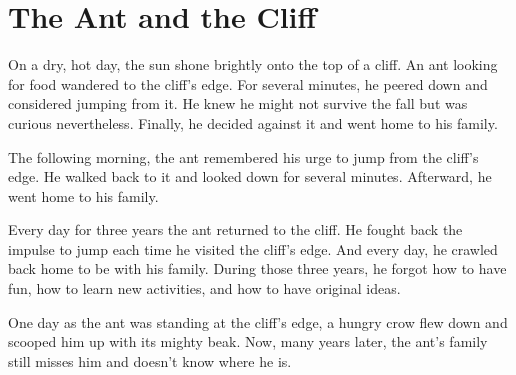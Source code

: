 \chapter{The Ant and the Cliff}

On a dry, hot day, the sun shone brightly onto the top of a cliff. An ant looking for food wandered to the cliff's edge. For several minutes, he peered down and considered jumping from it. He knew he might not survive the fall but was curious nevertheless. Finally, he decided against it and went home to his family.

The following morning, the ant remembered his urge to jump from the cliff's edge. He walked back to it and looked down for several minutes. Afterward, he went home to his family.

Every day for three years the ant returned to the cliff. He fought back the impulse to jump each time he visited the cliff's edge. And every day, he crawled back home to be with his family. During those three years, he forgot how to have fun, how to learn new activities, and how to have original ideas.

One day as the ant was standing at the cliff's edge, a hungry crow flew down and scooped him up with its mighty beak. Now, many years later, the ant's family still misses him and doesn't know where he is.